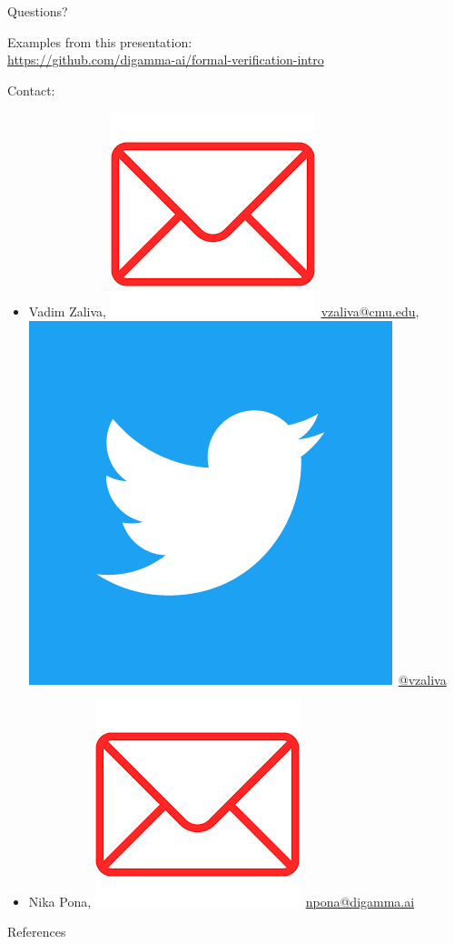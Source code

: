 \documentclass[10pt]{beamer}
\begin{document}
\begin{frame}{Questions?}

Examples from this presentation: \\ {\small\url{https://github.com/digamma-ai/formal-verification-intro}}

\vspace*{2\baselineskip}

Contact: 
\begin{itemize}
    \item Vadim Zaliva, \includegraphics[height=\fontcharht\font`\B]{email.png}\ \href{mailto:vzaliva@cmu.edu}{vzaliva@cmu.edu}, \includegraphics[height=\fontcharht\font`\B]{Twitter_Social_Icon_Square_Color.png}\ \href{https://twitter.com/vzaliva}{@vzaliva}
    \item Nika Pona, \includegraphics[height=\fontcharht\font`\B]{email.png}\ \href{mailto:npona@digamma.ai}{npona@digamma.ai}
\end{itemize}




\end{frame}
    
\begin{frame}[allowframebreaks]{References}

  
  

\end{frame}
\end{document}
